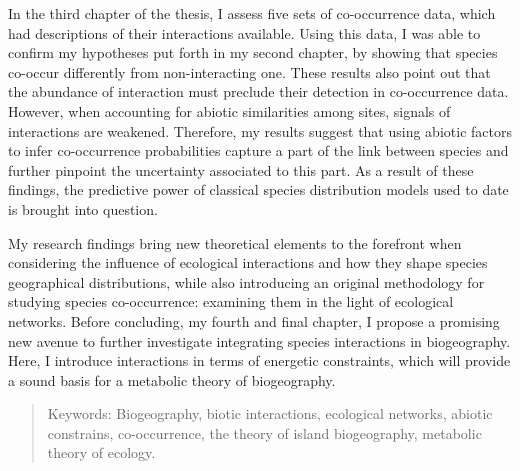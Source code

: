 In the third chapter of the thesis, I assess five sets of co-occurrence
data, which had descriptions of their interactions available. Using this
data, I was able to confirm my hypotheses put forth in my second
chapter, by showing that species co-occur differently from
non-interacting one. These results also point out that the abundance of
interaction must preclude their detection in co-occurrence data.
However, when accounting for abiotic similarities among sites, signals
of interactions are weakened. Therefore, my results suggest that using
abiotic factors to infer co-occurrence probabilities capture a part of
the link between species and further pinpoint the uncertainty associated
to this part. As a result of these findings, the predictive power of
classical species distribution models used to date is brought into
question.

My research findings bring new theoretical elements to the forefront
when considering the influence of ecological interactions and how they
shape species geographical distributions, while also introducing an
original methodology for studying species co-occurrence: examining them
in the light of ecological networks. Before concluding, my fourth and
final chapter, I propose a promising new avenue to further investigate
integrating species interactions in biogeography. Here, I introduce
interactions in terms of energetic constraints, which will provide a
sound basis for a metabolic theory of biogeography.

\begin{quote}
Keywords: Biogeography, biotic interactions, ecological networks,
abiotic constrains, co-occurrence, the theory of island biogeography,
metabolic theory of ecology.
\end{quote}

